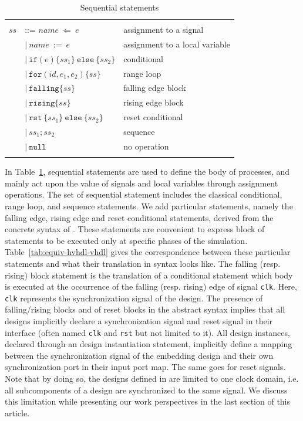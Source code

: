 \documentclass[pdflatex,sn-mathphys]{sn-jnl}%
\theoremstyle{thmstyleone}%
\theoremstyle{thmstyletwo}%
\theoremstyle{thmstylethree}%
\begin{document}
\begin{table}[!t]
  \caption{Sequential statements}
  \label{tab:ss}
  \begin{tabular}{|rll|}
    \hline
    & & \\
    $ss$ & ::= $name~\mathtt{\Leftarrow}~e$ & assignment to a signal \\
    & \quad$\vert{}~name~\mathtt{:=}~e$ & assignment to a local variable \\
    & \quad$\vert{}~\mathtt{if}(e)\{ss_1\}~\mathtt{else}~\{ss_2\}$ & conditional \\
    & \quad$\vert{}~\mathtt{for}(id,e_1,e_2)\{ss\}$ & range loop \\
    & \quad$\vert{}~\mathtt{falling}\{ss\}$ & falling edge block \\
    & \quad$\vert{}~\mathtt{rising}\{ss\}$ & rising edge block \\
    & \quad$\vert{}~\mathtt{rst}~\{ss_1\}~\mathtt{else}~\{ss_2\}$ & reset conditional \\
    & \quad$\vert{}~ss_1\mathtt{;}ss_2$ & sequence \\
    & \quad$\vert{}~\mathtt{null}$ & no operation \\
    & & \\
    \hline
  \end{tabular}
\end{table}

In Table~\ref{tab:ss}, sequential statements are used to define the
body of processes, and mainly act upon the value of signals and local
variables through assignment operations. The set of sequential
statement includes the classical conditional, range loop, and sequence
statements. We add particular statements, namely the falling edge,
rising edge and reset conditional statements, derived from the
concrete syntax of \vhdl{}.  These statements are convenient to
express block of statements to be executed only at specific phases of
the simulation. Table~\ref{tab:equiv-hvhdl-vhdl} gives the
correspondence between these particular \hvhdl{} statements and what
their translation in \vhdl{} syntax looks like. The falling
(resp. rising) block statement is the translation of a conditional
statement which body is executed at the occurrence of the falling
(resp. rising) edge of signal \texttt{clk}. Here, \texttt{clk}
represents the synchronization signal of the design. The presence of
falling/rising blocks and of reset blocks in the \hvhdl{} abstract
syntax implies that all \hvhdl{} designs implicitly declare a
synchronization signal and reset signal in their interface (often
named \texttt{clk} and \texttt{rst} but not limited to it). All design
instances, declared through an design instantiation statement,
implicitly define a mapping between the synchronization signal of the
embedding design and their own synchronization port in their input
port map. The same goes for reset signals. Note that by doing so, the
designs defined in \hvhdl{} are limited to one clock domain, i.e. all
subcomponents of a design are synchronized to the same signal. We
discuss this limitation while presenting our work perspectives in the
last section of this article.
\end{document}

